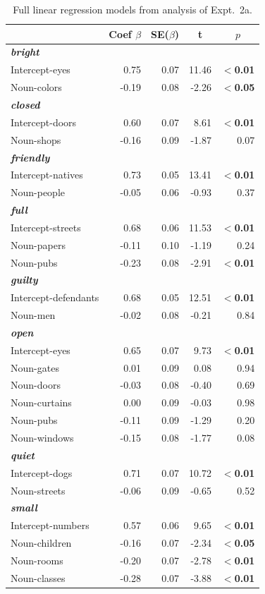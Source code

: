 \documentclass[linguex]{sp}
\begin{document}
\begin{table}[htb] 
	\centering \caption{Full linear regression models from analysis of Expt.~2a.} \label{expt2aanalysis}
\begin{tabular}{lrrrr}\toprule
	&	Coef $\beta$	&	SE($\beta$)	&	\multicolumn{1}{c}{ \textbf{t}}	&	\multicolumn{1}{c}{$p$}\\ \midrule
\emph{\textbf{bright}} \\
Intercept-eyes	& 	0.75 &	0.07	&	11.46	&	\textbf{$<$0.01} \\
Noun-colors	&	-0.19	&   0.08	&	-2.26	&	\textbf{$<$0.05} \\ \hline
\emph{\textbf{closed}}\\
Intercept-doors	& 	0.60	&	0.07	&	8.61	&	\textbf{$<$0.01} \\
Noun-shops	&	-0.16	&   0.09	&	-1.87	&	0.07 \\ \hline
\emph{\textbf{friendly}}\\
Intercept-natives	& 	0.73	&	0.05	&	13.41	&	\textbf{$<$0.01} \\
Noun-people	&	-0.05	&   0.06	&	-0.93	&	0.37 \\\hline
\emph{\textbf{full}}\\
Intercept-streets	& 	0.68	&	0.06	&	11.53	&	\textbf{$<$0.01} \\
Noun-papers	&	-0.11	&   0.10	&	-1.19	&	0.24 \\
Noun-pubs	&	-0.23	&   0.08	&	-2.91	&	\textbf{$<$0.01} \\\hline
\emph{\textbf{guilty}}\\
Intercept-defendants	& 	0.68	&	0.05	&	12.51	&	\textbf{$<$0.01} \\
Noun-men	&	-0.02	&   0.08	&	-0.21	&	0.84 \\\hline
\emph{\textbf{open}}\\
Intercept-eyes	& 	0.65	&	0.07	&	9.73	&	\textbf{$<$0.01} \\
Noun-gates	&	0.01	&   0.09	&	0.08	&	0.94 \\
Noun-doors	&	-0.03	&   0.08	&	-0.40	&	0.69 \\
Noun-curtains	&	0.00	&   0.09	&	-0.03	&	0.98 \\
Noun-pubs	&	-0.11	&   0.09 	&	-1.29	&	0.20 \\
Noun-windows	&	-0.15	&   0.08	&	-1.77	&	0.08 \\\hline
\emph{\textbf{quiet}}\\
Intercept-dogs	& 	0.71	&	0.07	&	10.72	&	\textbf{$<$0.01} \\
Noun-streets	&	-0.06	&   0.09	&	-0.65	&	0.52 \\\hline
\emph{\textbf{small}}\\
Intercept-numbers	& 	0.57	&	0.06	&	9.65	&	\textbf{$<$0.01} \\
Noun-children	&	-0.16	&   0.07	&	-2.34	&	\textbf{$<$0.05} \\
Noun-rooms	&	-0.20	&   0.07	&	-2.78	&	\textbf{$<$0.01} \\
Noun-classes	&	-0.28	&   0.07	&	-3.88	&	\textbf{$<$0.01} \\
\bottomrule
\end{tabular}
\end{table}
\end{document}
